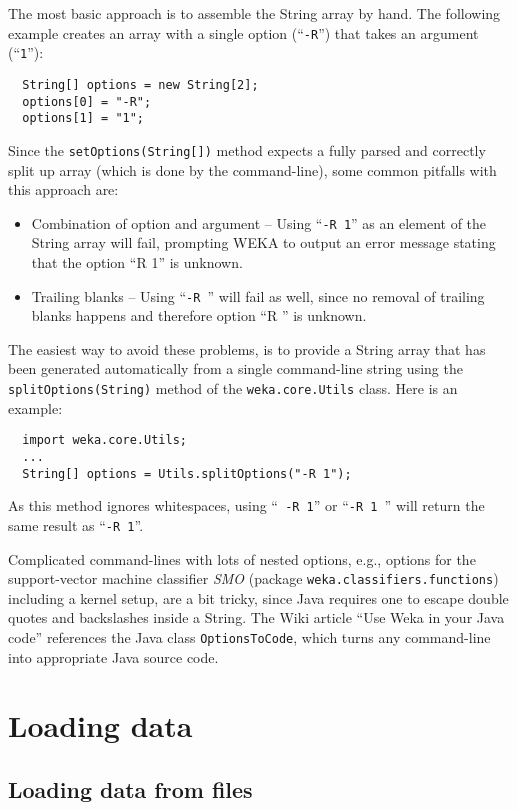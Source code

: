 The most basic approach is to assemble the String array by hand. The following
example creates an array with a single option (``\texttt{-R}'') that takes an
argument (``\texttt{1}''):
\begin{verbatim}
  String[] options = new String[2];
  options[0] = "-R";
  options[1] = "1";
\end{verbatim}
Since the \texttt{setOptions(String[])} method expects a fully parsed and
correctly split up array (which is done by the command-line), some common
pitfalls with this approach are:
\begin{itemize}
	\item Combination of option and argument -- Using ``\texttt{-R 1}'' as an
element of the String array will fail, prompting WEKA to output an error message
stating that the option ``R 1'' is unknown.
	\item Trailing blanks -- Using ``\texttt{-R }'' will fail as well, since no
removal of trailing blanks happens and therefore option ``R '' is unknown.
\end{itemize}
The easiest way to avoid these problems, is to provide a String array that has
been generated automatically from a single command-line string using the
\texttt{splitOptions(String)} method of the \texttt{weka.core.Utils} class.
Here is an example:
\begin{verbatim}
  import weka.core.Utils;
  ...
  String[] options = Utils.splitOptions("-R 1");
\end{verbatim}
As this method ignores whitespaces, using ``\texttt{  -R    1}'' or
``\texttt{-R 1 }'' will return the same result as ``\texttt{-R 1}''.

Complicated command-lines with lots of nested options, e.g., options for the
support-vector machine classifier \textit{SMO} (package
\texttt{weka.classifiers.functions}) including a kernel setup, are a bit tricky,
since Java requires one to escape double quotes and backslashes inside a
String. The Wiki\cite{wekawiki} article ``Use Weka in your Java code''
references the Java class \texttt{OptionsToCode}, which turns any command-line
into appropriate Java source code.

\newpage

\section{Loading data}
\subsection{Loading data from files}
